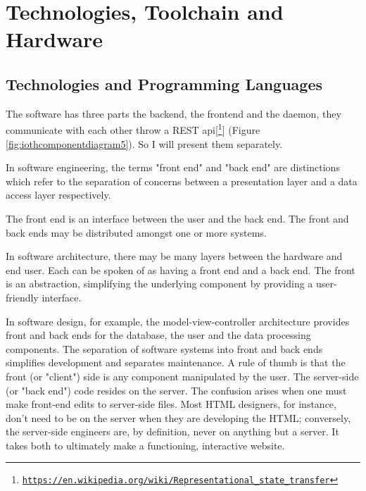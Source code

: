 
\chapter{Technologies, Toolchain and Hardware} %

\label{Technologies, Toolchain and Hardware} %


\section{Technologies and Programming Languages}

The software has three parts the backend, the frontend and the daemon, they communicate with each other throw a REST api[\footnote{\href{https://en.wikipedia.org/wiki/Representational\_state\_transfer}{\texttt{https://en.wikipedia.org/wiki/Representational\_state\_transfer}}}] (Figure \ref{fig:iothcomponentdiagram5}). So I will present them separately.
\newline

In software engineering, the terms "front end" and "back end" are distinctions which refer to the separation of concerns between a presentation layer and a data access layer respectively.
\newline

The front end is an interface between the user and the back end. The front and back ends may be distributed amongst one or more systems.
\newline

In software architecture, there may be many layers between the hardware and end user. Each can be spoken of as having a front end and a back end. The front is an abstraction, simplifying the underlying component by providing a user-friendly interface.
\newline

In software design, for example, the model-view-controller architecture provides front and back ends for the database, the user and the data processing components. The separation of software systems into front and back ends simplifies development and separates maintenance. A rule of thumb is that the front (or "client") side is any component manipulated by the user. The server-side (or "back end") code resides on the server. The confusion arises when one must make front-end edits to server-side files. Most HTML designers, for instance, don't need to be on the server when they are developing the HTML; conversely, the server-side engineers are, by definition, never on anything but a server. It takes both to ultimately make a functioning, interactive website.


